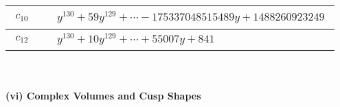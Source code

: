 \documentclass[1p]{elsarticle_modified}
\theoremstyle{definition}
\begin{document}
\begin{tabular}{m{50pt}|m{274pt}}
\hline $$\begin{aligned}c_{10}\end{aligned}$$&$\begin{aligned}
&y^{130}+59 y^{129}+\cdots-175337048515489 y+1488260923249
\end{aligned}$\\
\hline $$\begin{aligned}c_{12}\end{aligned}$$&$\begin{aligned}
&y^{130}+10 y^{129}+\cdots+55007 y+841
\end{aligned}$\\
\hline
\end{tabular}\\~\\
\newpage\flushleft \textbf{(vi) Complex Volumes and Cusp Shapes}
\end{document}
